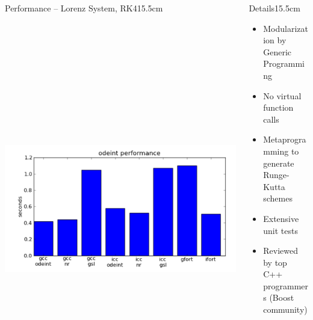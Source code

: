 \documentclass[final,hyperref={pdfpagelabels=false}]{beamer}
\begin{document}
\begin{frame}[fragile]{}
\begin{columns}[t]
\begin{column}{0.495\linewidth}
    \begin{blockwh}{Performance -- Lorenz System, RK4}{15.5cm}
     \centering
     \includegraphics[height=17.1cm]{performance.png}
    \end{blockwh}
  \end{column}

  \begin{column}{0.24\linewidth}
    \begin{blockwh}{Details}{15.5cm}
     \begin{itemize}
      \item Modularization by Generic Programming
      \item No virtual function calls
      \item Metaprogramming to generate Runge-Kutta schemes
      \item Extensive unit tests
      \item Reviewed by top C++ programmers (Boost community)
     \end{itemize}
    \end{blockwh}
  \end{column}
  

\end{columns}
\end{frame}
\end{document}
